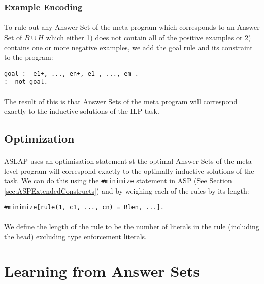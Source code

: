 \documentclass{article}
\theoremstyle{plain}
\theoremstyle{definition}
\begin{document}
\begin{multicols}{2}
\subsubsection{Example Encoding}

\paragraph{} To rule out any Answer Set of the meta program which corresponds to an Answer Set of $B \cup H$ which either 1) does not contain all of the positive examples or 2) contains one or more negative examples, we add the goal rule and its constraint to the program:

\begin{lstlisting}
goal :- e1+, ..., en+, e1-, ..., em-.
:- not goal.
\end{lstlisting}

\paragraph{} The result of this is that Answer Sets of the meta program will correspond exactly to the inductive solutions of the ILP task. 

\subsection{Optimization}

\paragraph{} ASLAP uses an optimisation statement st the optimal Answer Sets of the meta level program will correspond exactly to the optimally inductive solutions of the task. We can do this using the \lstinline{#minimize} statement in ASP (See Section \ref{sec:ASPExtendedConstructs}) and by weighing each of the rules by its length:

\begin{lstlisting}
#minimize[rule(1, c1, ..., cn) = Rlen, ...].
\end{lstlisting}

\paragraph{} We define the length of the rule to be the number of literals in the rule (including the head) excluding type enforcement literals.

\section{Learning from Answer Sets}


\end{multicols}
\end{document}
